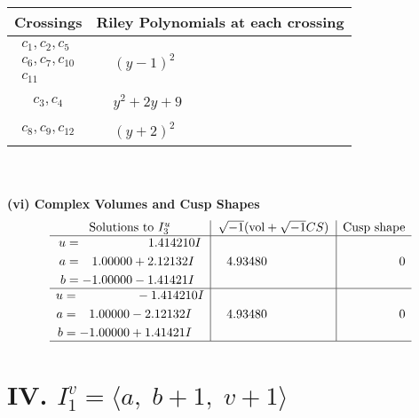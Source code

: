 \documentclass[1p]{elsarticle_modified}
\theoremstyle{definition}
\newcommand{\I}{\sqrt{-1}}
\begin{document}
\begin{tabular}{m{50pt}|m{274pt}}
Crossings & \hspace{64pt}Riley Polynomials at each crossing \\
\hline $$\begin{aligned}c_{1},c_{2},c_{5}\\c_{6},c_{7},c_{10}\\c_{11}\end{aligned}$$&$\begin{aligned}
&(y-1)^2
\end{aligned}$\\
\hline $$\begin{aligned}c_{3},c_{4}\end{aligned}$$&$\begin{aligned}
&y^2+2 y+9
\end{aligned}$\\
\hline $$\begin{aligned}c_{8},c_{9},c_{12}\end{aligned}$$&$\begin{aligned}
&(y+2)^2
\end{aligned}$\\
\hline
\end{tabular}\\~\\
\newpage\flushleft \textbf{(vi) Complex Volumes and Cusp Shapes}
$$\begin{array}{c|c|c}  
\text{Solutions to }I^u_{3}& \I (\text{vol} + \sqrt{-1}CS) & \text{Cusp shape}\\
 \hline 
\begin{aligned}
u &= \phantom{-0.000000 -}1.414210 I \\
a &= \phantom{-}1.00000 + 2.12132 I \\
b &= -1.00000 - 1.41421 I\end{aligned}
 & \phantom{-}4.93480\phantom{ +0.000000I} & \phantom{-0.000000 } 0 \\ \hline\begin{aligned}
u &= \phantom{-0.000000 } -1.414210 I \\
a &= \phantom{-}1.00000 - 2.12132 I \\
b &= -1.00000 + 1.41421 I\end{aligned}
 & \phantom{-}4.93480\phantom{ +0.000000I} & \phantom{-0.000000 } 0\\
 \hline 
 \end{array}$$\newpage\newpage\renewcommand{\arraystretch}{1}
\centering \section*{IV. $I^v_{1}= \langle a,\;b+1,\;v+1 \rangle$}
\end{document}
